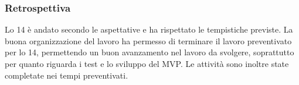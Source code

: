 \subsubsection{Retrospettiva}
\label{sec:retrospettiva_sprint14}

Lo  14 è andato secondo le aspettative e ha rispettato le tempistiche previste.
La buona organizzazione del lavoro ha permesso di terminare il lavoro preventivato per lo  14, permettendo un buon avanzamento nel lavoro da svolgere, soprattutto per quanto riguarda i test e lo sviluppo del MVP. 
Le attività sono inoltre state completate nei tempi preventivati.